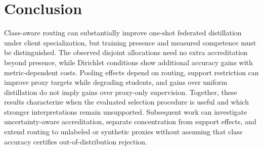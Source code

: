 \hypertarget{conclusion}{%
\section{Conclusion}\label{conclusion}}

Class-aware routing can substantially improve one-shot federated distillation under client specialization, but training presence and measured competence must be distinguished. The observed disjoint allocations need no extra accreditation beyond presence, while Dirichlet conditions show additional accuracy gains with metric-dependent costs. Pooling effects depend on routing, support restriction can improve proxy targets while degrading students, and gains over uniform distillation do not imply gains over proxy-only supervision. Together, these results characterize when the evaluated selection procedure is useful and which stronger interpretations remain unsupported. Subsequent work can investigate uncertainty-aware accreditation, separate concentration from support effects, and extend routing to unlabeled or synthetic proxies without assuming that class accuracy certifies out-of-distribution rejection.
